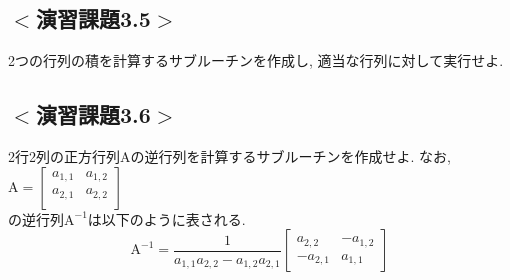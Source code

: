 

\subsection*{$<$演習課題3.5$>$}
2つの行列の積を計算するサブルーチンを作成し, 適当な行列に対して実行せよ. 

\subsection*{$<$演習課題3.6$>$}
2行2列の正方行列$\mathrm{A}$の逆行列を計算するサブルーチンを作成せよ. 
なお, 
$\mathrm{A} =
\begin{bmatrix}
  a_{1,1} & a_{1,2} \\
  a_{2,1} & a_{2,2} \\
\end{bmatrix}
$\\
の逆行列$\mathrm{A}^{-1}$は以下のように表される. 
\begin{equation}
\mathrm{A}^{-1} = \frac{1}{a_{1,1}a_{2,2}-a_{1,2}a_{2,1}}
\begin{bmatrix}
  a_{2,2} & -a_{1,2}\\
  -a_{2,1} & a_{1,1}
\end{bmatrix}
\end{equation}


